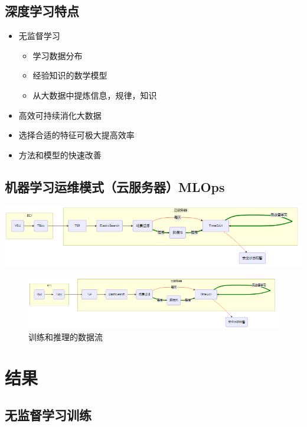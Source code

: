 \documentclass[a4paper, 11pt]{article}
\begin{document}
\subsection*{深度学习特点}
\label{sec:org273131b}
\begin{itemize}
\item 无监督学习
\begin{itemize}
\item 学习数据分布
\item 经验知识的数学模型
\item 从大数据中提炼信息，规律，知识
\end{itemize}
\item 高效可持续消化大数据
\item 选择合适的特征可极大提高效率
\item 方法和模型的快速改善
\end{itemize}
\subsection*{机器学习运维模式（云服务器）MLOps}
\label{sec:orgd2e9b34}

\begin{center}
\includegraphics[width=.9\linewidth]{./img/funes-production.png}
\label{Fig. Dataflow}
\end{center}


\begin{figure}[htbp]
\centering
\includegraphics[width=.9\linewidth]{./img/funes-production.png}
\caption{\label{Fig. Dataflow}训练和推理的数据流}
\end{figure}
\section*{结果}
\label{sec:org22b4047}
\subsection*{无监督学习训练}
\label{sec:orge2e708c}
\end{document}

